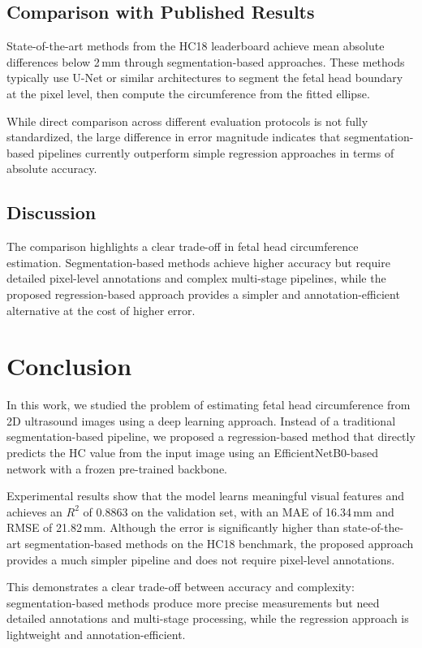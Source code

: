 \documentclass[conference]{IEEEtran}
\begin{document}
\subsection{Comparison with Published Results}

State-of-the-art methods from the HC18 leaderboard achieve mean absolute differences below 2\,mm through segmentation-based approaches. These methods typically use U-Net or similar architectures to segment the fetal head boundary at the pixel level, then compute the circumference from the fitted ellipse.

While direct comparison across different evaluation protocols is not fully standardized, the large difference in error magnitude indicates that segmentation-based pipelines currently outperform simple regression approaches in terms of absolute accuracy.

\subsection{Discussion}

The comparison highlights a clear trade-off in fetal head circumference estimation. Segmentation-based methods achieve higher accuracy but require detailed pixel-level annotations and complex multi-stage pipelines, while the proposed regression-based approach provides a simpler and annotation-efficient alternative at the cost of higher error.

\section{Conclusion}

In this work, we studied the problem of estimating fetal head circumference from 2D ultrasound images using a deep learning approach. Instead of a traditional segmentation-based pipeline, we proposed a regression-based method that directly predicts the HC value from the input image using an EfficientNetB0-based network with a frozen pre-trained backbone.

Experimental results show that the model learns meaningful visual features and achieves an $R^2$ of 0.8863 on the validation set, with an MAE of 16.34\,mm and RMSE of 21.82\,mm. Although the error is significantly higher than state-of-the-art segmentation-based methods on the HC18 benchmark, the proposed approach provides a much simpler pipeline and does not require pixel-level annotations.

This demonstrates a clear trade-off between accuracy and complexity: segmentation-based methods produce more precise measurements but need detailed annotations and multi-stage processing, while the regression approach is lightweight and annotation-efficient.
\end{document}

